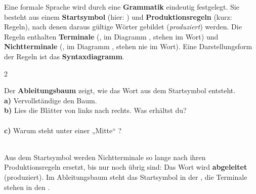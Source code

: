 \documentclass[11pt,a4paper]{article}
\begin{document}
\begin{merke}
Eine formale Sprache wird durch eine \textbf{Grammatik} eindeutig festgelegt. Sie besteht aus einem \textbf{Startsymbol} (hier: ) und \textbf{Produktionsregeln} (kurz: Regeln), nach denen daraus gültige Wörter gebildet (\emph{produziert}) werden. Die Regeln enthalten \textbf{Terminale} (, im Diagramm , stehen im Wort) und \textbf{Nichtterminale} (, im Diagramm , stehen nie im Wort). Eine Darstellungsform der Regeln ist das \textbf{Syntaxdiagramm}.
\end{merke}

\begin{aufgabe}[Ableitungsbaum]{2}
\begin{minipage}[t]{0.66\linewidth}
\vspace{0pt}
\end{minipage}\hfill
\begin{minipage}[t]{0.32\linewidth}
\vspace{0pt}
Der \textbf{Ableitungsbaum} zeigt, wie das Wort  aus dem Startsymbol entsteht.\\[0.5mm]
\textbf{a)} Vervollständige den Baum.\\[0.5mm]
\textbf{b)} Lies die Blätter von links nach rechts. Was erhältst du?\\ \\[0.5mm]
\textbf{c)} Warum steht unter einer „Mitte“ \eps?\\ 
\end{minipage}\\[1mm]
Aus dem Startsymbol werden Nichtterminale so lange nach ihren Produktionsregeln ersetzt, bis nur noch  übrig sind: Das Wort wird \textbf{abgeleitet} (produziert). Im Ableitungsbaum steht das Startsymbol in der , die Terminale stehen in den .
\end{aufgabe}
\end{document}

